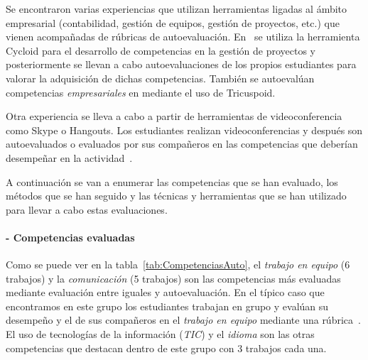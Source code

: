 Se encontraron varias experiencias que utilizan herramientas ligadas al ámbito empresarial (contabilidad, gestión de equipos, gestión de proyectos, etc.) que vienen acompañadas de rúbricas de autoevaluación.  En~\cite{chang2009international} se utiliza la herramienta Cycloid para el desarrollo de competencias en la gestión de proyectos y posteriormente se llevan a cabo autoevaluaciones de los propios estudiantes para valorar la adquisición de dichas competencias. También se autoevalúan competencias \emph{empresariales} en  \cite{achcaoucaou2014competence} mediante el uso de Tricuspoid.

Otra experiencia se lleva a cabo a partir de herramientas de videoconferencia como Skype o Hangouts. Los estudiantes realizan videoconferencias y después son autoevaluados o evaluados por sus compañeros en las competencias que deberían desempeñar en la actividad~\cite{masip2013self}.

A continuación se van a enumerar las competencias que se han evaluado, los métodos que se han seguido y las técnicas y herramientas que se han utilizado para llevar a cabo estas evaluaciones.

\paragraph*{- Competencias evaluadas}
Como se puede ver en la tabla~\ref{tab:CompetenciasAuto}, el \emph{trabajo en equipo} (6 trabajos) y la \emph{comunicación} (5 trabajos) son las competencias más evaluadas mediante evaluación entre iguales y autoevaluación. En el típico caso que encontramos en este grupo los estudiantes trabajan en grupo y evalúan su desempeño y el de sus compañeros en el \emph{trabajo en equipo} mediante una rúbrica~\cite{ficapal2015learning}.
El uso de tecnologías de la información (\emph{TIC}) y el \emph{idioma} son las otras competencias que destacan dentro de este grupo con 3 trabajos cada una. 

